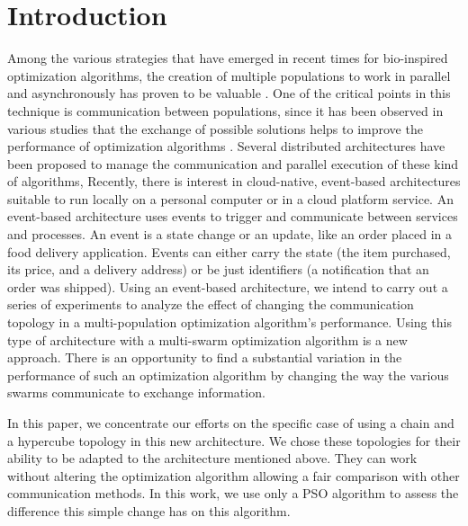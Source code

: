 \documentclass[runningheads]{llncs}
\begin{document}
\section{Introduction}

Among the various strategies that have emerged in recent times for bio-inspired
optimization algorithms, the creation of multiple populations to work in
parallel and asynchronously has proven to be valuable \cite{a1}.
One of the critical points in this technique is communication between populations, since
it has been observed in various studies that the exchange of possible solutions
helps to improve the performance of optimization algorithms \cite{a2}.
Several distributed architectures have been proposed to manage the communication 
and parallel execution of these kind of algorithms, %
Recently, there is interest in cloud-native, event-based architectures suitable to run locally on a personal computer or in a cloud platform service. 
An event-based architecture uses events to trigger and communicate between services and processes. An event is a state change or an update, like an order placed in a food delivery application. Events can either carry the state (the item purchased, its price, and a delivery address) or be just identifiers (a notification that an order was shipped). Using an event-based architecture, we intend to carry out a series of experiments to analyze the effect of changing the communication topology in a multi-population optimization algorithm's performance. Using this type of architecture with a multi-swarm optimization algorithm is a new approach. There is an opportunity to find a substantial variation in the performance of such an optimization algorithm by changing the way the various swarms communicate to exchange information. 


In this paper, we concentrate our efforts on the specific case of using a chain and a hypercube topology in this new architecture. We chose these topologies for their ability to be adapted to the architecture mentioned above. They can work without altering the optimization algorithm allowing a fair comparison with other communication methods. In this work, we use only a PSO algorithm to assess the difference this simple change has on this algorithm.
\end{document}
